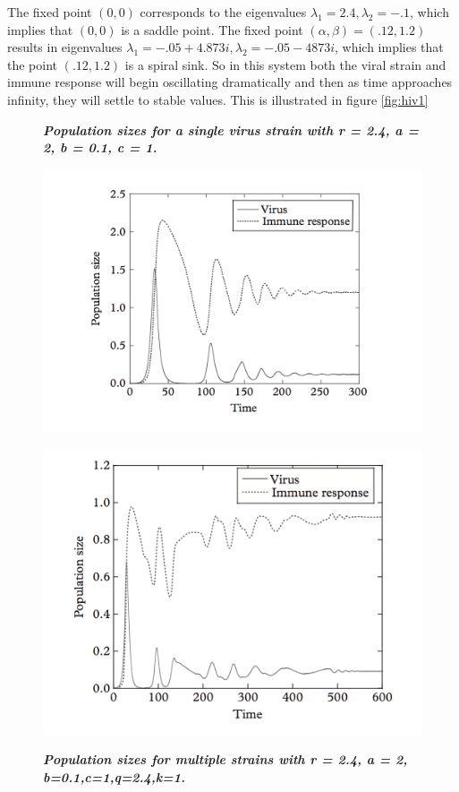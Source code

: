 \documentclass{article}
\begin{document}
The fixed point $(0,0)$ corresponds to the eigenvalues $\lambda_1 = 2.4, \lambda_2 = -.1$, which implies that $(0,0)$ is a saddle point. The fixed point $(\alpha,\beta) = (.12,1.2)$ results in eigenvalues $\lambda_1 = -.05 + 4.873i , \lambda_2 = -.05 - 4873i$, which implies that the point $(.12,1.2)$ is a spiral sink. So in this system both the viral strain and immune response will begin oscillating dramatically and then as time approaches infinity, they will settle to stable values. This is illustrated in figure \ref{fig:hiv1}
\label{sub:Determining Stability of Fixed points}
\begin{figure}[!tbp]
    \centering
    \begin{minipage}[b]{0.4\textwidth}
	    \caption{\textbf{\textit{Population sizes for a single virus strain with r = 2.4, a = 2, b = 0.1, c = 1.}}}
	    \includegraphics[scale=.25]{imgs/hiv_graph1.png}
	    \label{fig:hiv1}
	\end{minipage}
	\hfill
	\begin{minipage}[b]{0.4\textwidth}
		\caption{\textbf{\textit{Population sizes for multiple strains  with r = 2.4, a = 2, b=0.1,c=1,q=2.4,k=1.}}}
		\includegraphics[scale=.25]{imgs/hiv_graph2.png}
		\label{fig:hiv2}
	\end{minipage}
\end{figure}
\end{document}
